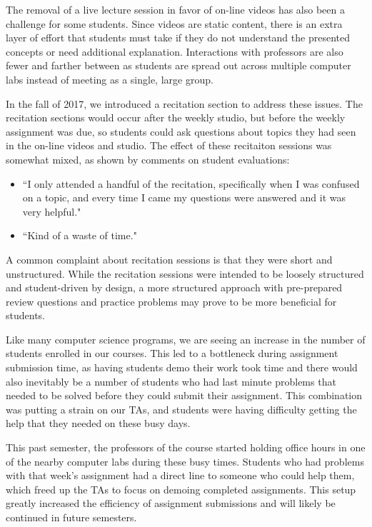 The removal of a live lecture session in favor of on-line videos has also been a challenge for some students. Since videos are static content, there is an extra layer of effort that students must take if they do not understand the presented concepts or need additional explanation. Interactions with professors are also fewer and farther between as students are spread out across multiple computer labs instead of meeting as a single, large group.

In the fall of 2017, we introduced a recitation section to address these issues. The recitation sections would occur after the weekly studio, but before the weekly assignment was due, so students could ask questions about topics they had seen in the on-line videos and studio. The effect of these recitaiton sessions was somewhat mixed, as shown by comments on student evaluations:
\begin{itemize}
\item ``I only attended a handful of the recitation, specifically when I was
confused on a topic, and every time I came my questions were answered and
it was very helpful."
\item ``Kind of a waste of time."
\end{itemize}

A common complaint about recitation sessions is that they were short and unstructured. While the recitation sessions were intended to be loosely structured and student-driven by design, a more structured approach with pre-prepared review questions and practice problems may prove to be more beneficial for students.

Like many computer science programs, we are seeing an increase in the number of students enrolled in our courses. This led to a bottleneck during assignment submission time, as having students demo their work took time and there would also inevitably be a number of students who had last minute problems that needed to be solved before they could submit their assignment. This combination was putting a strain on our TAs, and students were having difficulty getting the help that they needed on these busy days.

This past semester, the professors of the course started holding office hours in one of the nearby computer labs during these busy times. Students who had problems with that week's assignment had a direct line to someone who could help them, which freed up the TAs to focus on demoing completed assignments. This setup greatly increased the efficiency of assignment submissions and will likely be continued in future semesters.
